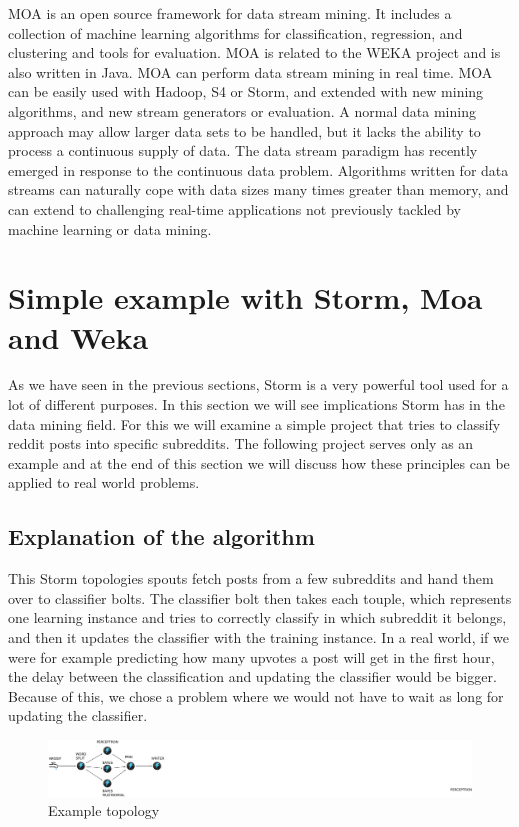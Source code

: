 \documentclass[journal]{IEEEtran/IEEEtran}
\begin{document}
MOA is an open source framework for data stream mining. It includes a collection of machine learning algorithms for classification, regression, and clustering and tools for evaluation. MOA is related to the WEKA project and is also written in Java. MOA can perform data stream mining in real time. MOA can be easily used with Hadoop, S4 or Storm, and extended with new mining algorithms, and new stream generators or evaluation. A normal data mining approach may allow larger data sets to be handled, but it lacks the ability to process a continuous supply of data. The data stream paradigm has recently emerged in response to the continuous data problem. Algorithms written for data streams can naturally cope with data sizes many times greater than memory, and can extend to challenging real-time applications not previously tackled by machine learning or data mining.

\section{Simple example with Storm, Moa and Weka}

As we have seen in the previous sections, Storm is a very powerful tool used for a lot of different purposes. In this section we will see implications Storm has in the data mining field. For this we will examine a simple project that tries to classify reddit posts into specific subreddits. The following project serves only as an example and at the end of this section we will discuss how these principles can be applied to real world problems.

\subsection{Explanation of the algorithm}

This Storm topologies spouts fetch posts from a few subreddits and hand them over to classifier bolts. The classifier bolt then takes each touple, which represents one learning instance and tries to correctly classify in which subreddit it belongs, and then it updates the classifier with the training instance. In a real world, if we were for example predicting how many upvotes a post will get in the first hour, the delay between the classification and updating the classifier would be bigger. Because of this, we chose a problem where we would not have to wait as long for updating the classifier. 

\begin{figure}[htbp]
    \begin{center}
        \includegraphics[scale=0.15]{img/shemaexample.png}
        \caption{Example topology}
        \label{res3}
    \end{center}
\end{figure}
\end{document}
